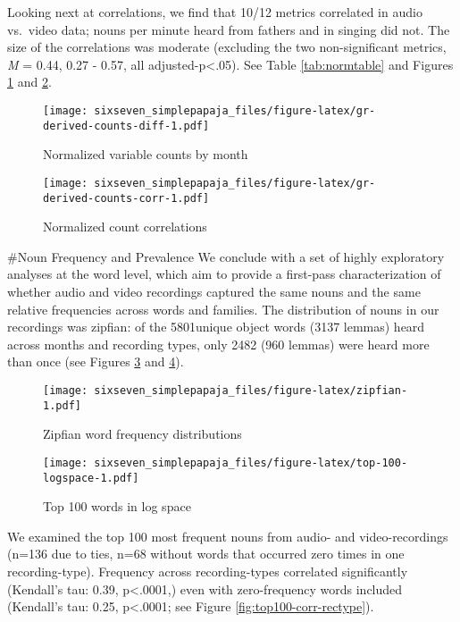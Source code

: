 \documentclass[floatsintext,man]{apa6}
\theoremstyle{definition}
\theoremstyle{definition}
\theoremstyle{definition}
\theoremstyle{remark}
\begin{document}
Looking next at correlations, we find that 10/12 metrics correlated in
audio vs.~video data; nouns per minute heard from fathers and in singing
did not. The size of the correlations was moderate (excluding the two
non-significant metrics, \emph{M} = 0.44, 0.27 - 0.57, all
adjusted-p\textless{}.05). See Table \ref{tab:normtable} and Figures
\ref{fig:gr-derived-counts-diff} and \ref{fig:gr-derived-counts-corr}.

\begin{figure}
\centering
\texttt{[image: sixseven\_simplepapaja\_files/figure-latex/gr-derived-counts-diff-1.pdf]}
\caption{\label{fig:gr-derived-counts-diff}Normalized variable counts by
month}
\end{figure}

\begin{figure}
\centering
\texttt{[image: sixseven\_simplepapaja\_files/figure-latex/gr-derived-counts-corr-1.pdf]}
\caption{\label{fig:gr-derived-counts-corr}Normalized count correlations}
\end{figure}

\#Noun Frequency and Prevalence We conclude with a set of highly
exploratory analyses at the word level, which aim to provide a
first-pass characterization of whether audio and video recordings
captured the same nouns and the same relative frequencies across words
and families. The distribution of nouns in our recordings was zipfian:
of the 5801unique object words (3137 lemmas) heard across months and
recording types, only 2482 (960 lemmas) were heard more than once (see
Figures \ref{fig:zipfian} and \ref{fig:top-100-logspace}).

\begin{figure}
\centering
\texttt{[image: sixseven\_simplepapaja\_files/figure-latex/zipfian-1.pdf]}
\caption{\label{fig:zipfian}Zipfian word frequency distributions}
\end{figure}

\begin{figure}
\centering
\texttt{[image: sixseven\_simplepapaja\_files/figure-latex/top-100-logspace-1.pdf]}
\caption{\label{fig:top-100-logspace}Top 100 words in log space}
\end{figure}

We examined the top 100 most frequent nouns from audio- and
video-recordings (n=136 due to ties, n=68 without words that occurred
zero times in one recording-type). Frequency across recording-types
correlated significantly (Kendall's tau: 0.39, p\textless{}.0001,) even
with zero-frequency words included (Kendall's tau: 0.25,
p\textless{}.0001; see Figure \ref{fig:top100-corr-rectype}).
\end{document}
